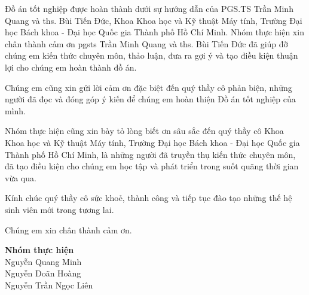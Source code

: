 Đồ án tốt nghiệp được hoàn thành dưới sự hướng dẫn của PGS.TS Trần Minh Quang và \acrshort{ths}. Bùi Tiến Đức, Khoa Khoa học và Kỹ thuật Máy tính, Trường Đại học Bách khoa - Đại học Quốc gia Thành phố Hồ Chí Minh. Nhóm thực hiện xin chân thành cảm ơn \acrshort{pgsts} Trần Minh Quang và \acrshort{ths}. Bùi Tiến Đức đã giúp đỡ chúng em kiến thức chuyên môn, thảo luận, đưa ra gợi ý và tạo điều kiện thuận lợi cho chúng em hoàn thành đồ án.

Chúng em cũng xin gửi lời cảm ơn đặc biệt đến quý thầy cô phản biện, những người đã đọc và đóng góp ý kiến để chúng em hoàn thiện Đồ án tốt nghiệp của mình.

Nhóm thực hiện cũng xin bày tỏ lòng biết ơn sâu sắc đến quý thầy cô Khoa Khoa học và Kỹ thuật Máy tính, Trường Đại học Bách khoa - Đại học Quốc gia Thành phố Hồ Chí Minh, là những người đã truyền thụ kiến thức chuyên môn, đã tạo điều kiện cho chúng em học tập và phát triển trong suốt quãng thời gian vừa qua.

Kính chúc quý thầy cô sức khoẻ, thành công và tiếp tục đào tạo những thế hệ sinh viên mới trong tương lai.


Chúng em xin chân thành cảm ơn.



\begin{flushright}
    \textbf{Nhóm thực hiện}\\
    Nguyễn Quang Minh \\
    Nguyễn Doãn Hoàng \\
    Nguyễn Trần Ngọc Liên \\
\end{flushright}